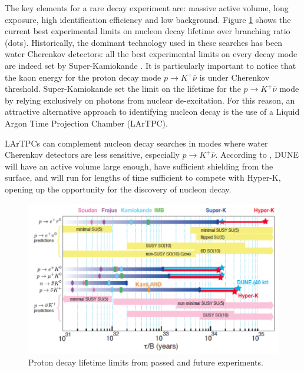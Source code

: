 The key elements for a rare decay experiment are: massive active volume, long exposure, high identification efficiency and low background. 
Figure \ref{fig:PDKExperimentalLImit} shows the current best experimental limits on nucleon decay lifetime over branching ratio (dots). Historically, the dominant technology used in these searches has been water Cherenkov detectors: all the best experimental limits on every decay mode are indeed set by Super-Kamiokande \cite{PhysRevD.90.072005,PhysRevLett.115.121803}.  It is particularly important to notice that the kaon energy for the proton decay mode $p \rightarrow K^+ \bar{\nu}$ is under Cherenkov threshold.  Super-Kamiokande set the limit on the lifetime for the $p \rightarrow K^+ \bar{\nu}$ mode by  relying exclusively on photons from nuclear de-excitation. For this reason, an attractive alternative approach to identifying nucleon decay is the use of a Liquid Argon Time Projection Chamber (LArTPC). 

LArTPCs can complement nucleon decay searches in modes where water Cherenkov detectors are less sensitive, especially $p\rightarrow K^+\bar{\nu}$.
According to \cite{Acciarri:Dune}, DUNE will have an active volume large enough, have sufficient shielding from the surface, and will run for lengths of time sufficient to compete with Hyper-K, opening up the opportunity for the discovery of nucleon decay. 

\begin{figure}[hbpt]
\centering
\includegraphics[width=6.5in]{images/PDKExperimentalLImit.png}
\caption{Proton decay lifetime limits from passed and future experiments.}
\label{fig:PDKExperimentalLImit}
\end{figure}

